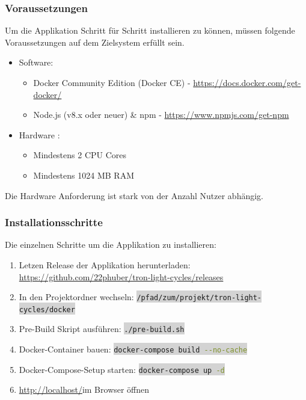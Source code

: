 \documentclass[11pt,ngerman]{article}
\newcommand{\inlinecode}[2]{\colorbox{lightgray}{\lstinline[language=#1]$#2$}}
\begin{document}
    \subsubsection{Voraussetzungen}
    Um die Applikation Schritt für Schritt installieren zu können, müssen folgende Voraussetzungen auf dem Zielsystem erfüllt sein.
    \begin{itemize}
        \item Software:
            \begin{itemize}
                \item Docker Community Edition (Docker CE) - \url{https://docs.docker.com/get-docker/}
                \item Node.js (v8.x oder neuer) \& npm  - \url{https://www.npmjs.com/get-npm}
            \end{itemize}
        \item Hardware :
            \begin{itemize}
                \item Mindestens 2 CPU Cores
                \item Mindestens 1024 MB RAM
            \end{itemize}
    \end{itemize}
    Die Hardware Anforderung ist stark von der Anzahl Nutzer abhängig.

    \subsubsection{Installationsschritte}
    Die einzelnen Schritte um die Applikation zu installieren:
    \begin{enumerate}
        \item Letzen Release der Applikation herunterladen: \url{https://github.com/22phuber/tron-light-cycles/releases}
        \item In den Projektordner wechseln: \inlinecode{bash}{/pfad/zum/projekt/tron-light-cycles/docker}
        \item Pre-Build Skript ausführen: \inlinecode{bash}{./pre-build.sh}
        \item \Gls{Docker}-Container bauen: \inlinecode{bash}{docker-compose build --no-cache}
        \item \Gls{Docker-Compose}-Setup starten: \inlinecode{bash}{docker-compose up -d}
        \item \url{http://localhost/}im Browser öffnen
    \end{enumerate}
\end{document}
